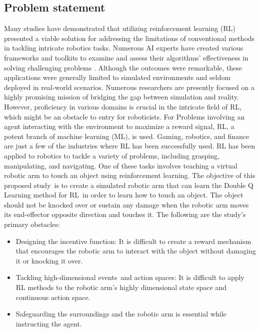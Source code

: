 \documentclass[12pt,oneside]{article}
\begin{document}


\subsection{Problem statement}

Many studies have demonstrated that utilizing reinforcement learning (RL) presented a viable solution for addressing the limitations of conventional methods in tackling intricate robotics tasks. Numerous AI experts have created various frameworks and toolkits to examine and assess their algorithms' effectiveness in solving challenging problems \cite{36_wu2020ethical}. Although the outcomes were remarkable, these applications were generally limited to simulated environments and seldom deployed in real-world scenarios. Numerous researchers are presently focused on a highly promising mission of bridging the gap between simulation and reality. However, proficiency in various domains is crucial in the intricate field of RL, which might be an obstacle to entry for roboticists.
For Problems involving an agent interacting with the environment to maximize a reward signal, RL, a potent branch of machine learning (ML), is used. Gaming, robotics, and finance are just a few of the industries where RL has been successfully used. RL has been applied to robotics to tackle a variety of problems, including grasping, manipulating, and navigating. One of these tasks involves teaching a virtual robotic arm to touch an object using reinforcement learning.
The objective of this proposed study is to create a simulated robotic arm that can learn the Double Q Learning method for RL in order to learn how to touch an object. The object should not be knocked over or sustain any damage when the robotic arm moves its end-effector opposite direction and touches it. 
The following are the study's primary obstacles:
\begin{itemize}
\item Designing the incentive function: It is difficult to create a reward mechanism that encourages the robotic arm to interact with the object without damaging it or knocking it over.
\item Tackling high-dimensional events and action spaces: It is difficult to apply RL methods to the robotic arm's highly dimensional state space and continuous action space.
\item Safeguarding the surroundings and the robotic arm is essential while instructing the agent.
\end{itemize}
\end{document}
